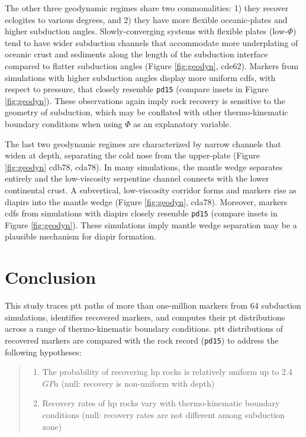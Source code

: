 The other three geodynamic regimes share two commonalities: 1) they recover eclogites to various degrees, and 2) they have more flexible oceanic-plates and higher subduction angles. Slowly-converging systems with flexible plates (low-\(\Phi\)) tend to have wider subduction channels that accommodate more underplating of oceanic crust and sediments along the length of the subduction interface compared to flatter subduction angles (Figure \ref{fig:geodyn}, cde62). Markers from simulations with higher subduction angles display more uniform \glspl{cdf}, with respect to pressure, that closely resemble \texttt{pd15} (compare insets in Figure \ref{fig:geodyn}). These observations again imply rock recovery is sensitive to the geometry of subduction, which may be conflated with other thermo-kinematic boundary conditions when using \(\Phi\) as an explanatory variable.

The last two geodynamic regimes are characterized by narrow channels that widen at depth, separating the cold nose from the upper-plate (Figure \ref{fig:geodyn} cdb78, cda78). In many simulations, the mantle wedge separates entirely and the low-viscosity serpentine channel connects with the lower continental crust. A subvertical, low-viscosity corridor forms and markers rise as diapirs into the mantle wedge (Figure \ref{fig:geodyn}, cda78). Moreover, markers \glspl{cdf} from simulations with diapirs closely resemble \texttt{pd15} (compare insets in Figure \ref{fig:geodyn}). These simulations imply mantle wedge separation may be a plausible mechanism for diapir formation.

\hypertarget{chpt4Conclusions}{%
\section{Conclusion}\label{chpt4Conclusions}}

This study traces \gls{ptt} paths of more than one-million markers from 64 subduction simulations, identifies recovered markers, and computes their \gls{pt} distributions across a range of thermo-kinematic boundary conditions. \gls{ptt} distributions of recovered markers are compared with the rock record (\texttt{pd15}) to address the following hypotheses:

\begin{quote}
\begin{enumerate}
\def\labelenumi{\arabic{enumi}.}
\item
  The probability of recovering \gls{hp} rocks is relatively uniform up to 2.4 \(GPa\) (null: recovery is non-uniform with depth)
\item
  Recovery rates of \gls{hp} rocks vary with thermo-kinematic boundary conditions (null: recovery rates are not different among subduction zone)
\end{enumerate}
\end{quote}

